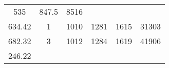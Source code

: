 \documentclass[]{book}
\theoremstyle{definition}
\theoremstyle{definition}
\theoremstyle{definition}
\theoremstyle{remark}
\begin{document}
\begin{longtable}[]{@{}cccccc@{}}
\begin{minipage}[t]{0.13\columnwidth}
535\strut
\end{minipage} & \begin{minipage}[t]{0.13\columnwidth}\centering\strut
847.5\strut
\end{minipage} & \begin{minipage}[t]{0.13\columnwidth}\centering\strut
8516\strut
\end{minipage}\tabularnewline
\begin{minipage}[t]{0.15\columnwidth}\centering\strut
634.42\strut
\end{minipage} & \begin{minipage}[t]{0.13\columnwidth}\centering\strut
1\strut
\end{minipage} & \begin{minipage}[t]{0.13\columnwidth}\centering\strut
1010\strut
\end{minipage} & \begin{minipage}[t]{0.13\columnwidth}\centering\strut
1281\strut
\end{minipage} & \begin{minipage}[t]{0.13\columnwidth}\centering\strut
1615\strut
\end{minipage} & \begin{minipage}[t]{0.13\columnwidth}\centering\strut
31303\strut
\end{minipage}\tabularnewline
\begin{minipage}[t]{0.15\columnwidth}\centering\strut
682.32\strut
\end{minipage} & \begin{minipage}[t]{0.13\columnwidth}\centering\strut
3\strut
\end{minipage} & \begin{minipage}[t]{0.13\columnwidth}\centering\strut
1012\strut
\end{minipage} & \begin{minipage}[t]{0.13\columnwidth}\centering\strut
1284\strut
\end{minipage} & \begin{minipage}[t]{0.13\columnwidth}\centering\strut
1619\strut
\end{minipage} & \begin{minipage}[t]{0.13\columnwidth}\centering\strut
41906\strut
\end{minipage}\tabularnewline
\begin{minipage}[t]{0.15\columnwidth}\centering\strut
246.22\strut
\end{minipage} & \begin{minipage}[t]{0.13\columnwidth}\centering\strut

\end{minipage}
\end{longtable}
\end{document}
